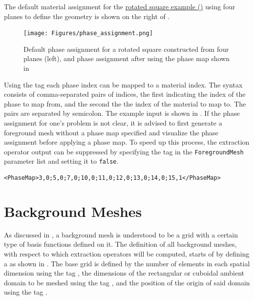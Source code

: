 The default material assignment for the \href{https://github.com/kkmaute/moris/blob/main/share/doc/mesh_generation/examples/Rotated_Square_Example.xml}{rotated square example (\ExternalLink)} using four planes to define the geometry is shown on the right of . 

\begin{figure}[t]
    \begin{center}
    \texttt{[image: Figures/phase\_assignment.png]}
    \caption{Default phase assignment for a rotated square constructed from four planes (left), and phase assignment after using the phase map shown in } 
    \label{fig:phase_assignment}
    \end{center}
\end{figure}

Using the tag  each phase index can be mapped to a material index. The syntax consists of comma-separated pairs of indices, the first indicating the index of the phase to map from, and the second the the index of the material to map to. The pairs are separated by semicolon. The example input is shown in . If the phase assignment for one's problem is not clear, it is advised to first generate a foreground mesh without a phase map specified and visualize the phase assignment before applying a phase map. To speed up this process, the extraction operator output can be suppressed by specifying the tag  in the \texttt{ForegroundMesh} parameter list and setting it to \texttt{false}.

\begin{minipage}{\linewidth}
\vspace{0.5cm}
\begin{lstlisting}[caption={Phase map for the material re-assignment shown in \Cref{fig:phase_assignment}},captionpos=b, label={lst:phase_map}]
<PhaseMap>3,0;5,0;7,0;10,0;11,0;12,0;13,0;14,0;15,1</PhaseMap>
\end{lstlisting}
\end{minipage}
    

\section{Background Meshes}
\label{sec:tutorial_background}

As discussed in , a background mesh is understood to be a grid with a certain type of basis functions defined on it. The definition of all background meshes, with respect to which extraction operators will be computed, starts of by defining a  as shown in . The base grid is defined by the number of elements in each spatial dimension using the tag , the dimensions of the rectangular or cuboidal ambient domain to be meshed using the tag , and the position of the origin of said domain using the tag .

